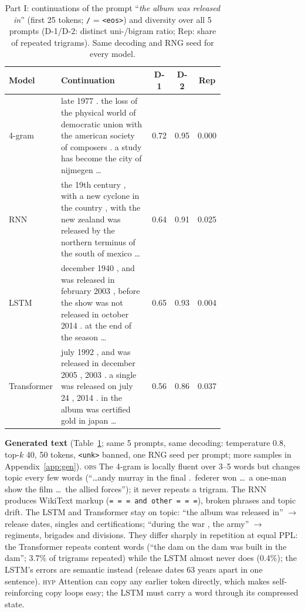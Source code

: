 \documentclass[10pt,a4paper]{article}
\newcommand{\obs}{\textsc{obs}}
\newcommand{\hyp}{\textsc{hyp}}
\begin{document}
\begin{table}[t]
\centering\small
\caption{Part I: continuations of the prompt ``\emph{the album was released in}'' (first 25 tokens;
\texttt{/} = \texttt{<eos>}) and diversity over all 5 prompts (D-1/D-2: distinct uni-/bigram ratio; Rep: share
of repeated trigrams). Same decoding and RNG seed for every model.}
\label{tab:gen}
\begin{tabular}{p{0.11\linewidth}p{0.62\linewidth}ccc}
\toprule
Model & Continuation & D-1 & D-2 & Rep\\
\midrule
4-gram & late 1977 . the loss of the physical world of democratic union with the american society of composers . a study has become the city of nijmegen \ldots & 0.72 & 0.95 & 0.000\\
RNN & the 19th century , with a new cyclone in the country , with the new zealand was released by the northern terminus of the south of mexico \ldots & 0.64 & 0.91 & 0.025\\
LSTM & december 1940 , and was released in february 2003 , before the show was not released in october 2014 . at the end of the season \ldots & 0.65 & 0.93 & 0.004\\
Transformer & july 1992 , and was released in december 2005 , 2003 . a single was released on july 24 , 2014 . in the album was certified gold in japan \ldots & 0.56 & 0.86 & 0.037\\
\bottomrule
\end{tabular}
\end{table}

\textbf{Generated text} (Table~\ref{tab:gen}; same 5 prompts, same decoding: temperature 0.8, top-$k$ 40, 50
tokens, \texttt{<unk>} banned, one RNG seed per prompt; more samples in Appendix~\ref{app:gen}). \obs{} The 4-gram is
locally fluent over 3--5 words but changes topic every few words (``\ldots andy murray in the final .\
federer won \ldots\ a one-man show the film \ldots\ the allied forces''); it never repeats a trigram. The RNN
produces WikiText markup (\texttt{= = = and other = = =}), broken phrases and topic drift. The LSTM and
Transformer stay on topic: ``the album was released in'' $\to$ release dates, singles and certifications;
``during the war , the army'' $\to$ regiments, brigades and divisions. They differ sharply in repetition at
equal PPL: the Transformer repeats content words (``the dam on the dam was built in the dam''; 3.7\% of
trigrams repeated) while the LSTM almost never does (0.4\%); the LSTM's errors are semantic instead (release
dates 63 years apart in one sentence).
\hyp{} Attention can copy any earlier token directly, which makes self-reinforcing copy loops easy; the
LSTM must carry a word through its compressed state.
\end{document}
